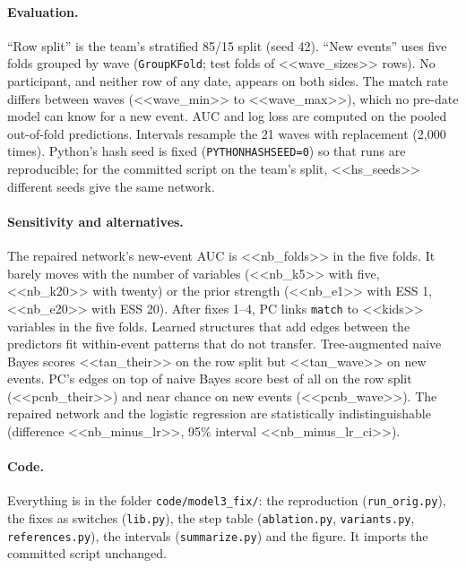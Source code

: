 \paragraph{Evaluation.} ``Row split'' is the team's stratified 85/15 split (seed 42). ``New events''
uses five folds grouped by wave (\texttt{GroupKFold}; test folds of <<wave_sizes>> rows). No
participant, and neither row of any date, appears on both sides. The match rate differs between
waves (<<wave_min>> to <<wave_max>>), which no pre-date model can know for a new event. AUC and log
loss are computed on the pooled out-of-fold predictions. Intervals resample the 21 waves with
replacement (2{,}000 times). Python's hash seed is fixed (\texttt{PYTHONHASHSEED=0}) so that runs
are reproducible; for the committed script on the team's split, <<hs_seeds>> different seeds give the
same network.

\paragraph{Sensitivity and alternatives.} The repaired network's new-event AUC is
<<nb_folds>> in the five folds. It barely moves with the number of variables (<<nb_k5>> with five,
<<nb_k20>> with twenty) or the prior strength (<<nb_e1>> with ESS 1, <<nb_e20>> with ESS 20).
After fixes 1--4, PC links \texttt{match} to <<kids>> variables in the five folds. Learned
structures that add edges between the predictors fit within-event patterns that do not transfer.
Tree-augmented naive Bayes \cite{friedman1997bayesian} scores <<tan_their>> on the row split but
<<tan_wave>> on new events. PC's edges on top of naive Bayes score best of all on the row split
(<<pcnb_their>>) and near chance on new events (<<pcnb_wave>>). The repaired network and the
logistic regression are statistically indistinguishable (difference <<nb_minus_lr>>, 95\%
interval <<nb_minus_lr_ci>>).

\paragraph{Code.} Everything is in the folder \texttt{code/model3\_fix/}: the reproduction
(\texttt{run\_orig.py}), the fixes as switches (\texttt{lib.py}), the step table
(\texttt{ablation.py}, \texttt{variants.py}, \texttt{references.py}), the intervals
(\texttt{summarize.py}) and the figure. It imports the committed script unchanged.
